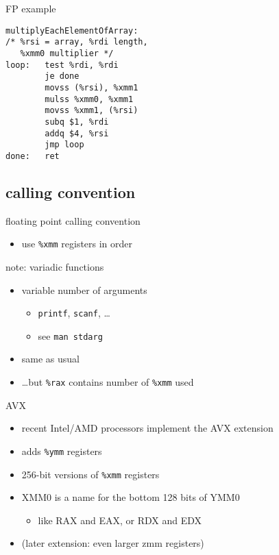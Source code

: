 \begin{frame}[fragile,label=fpExample]{FP example}
\begin{lstlisting}
multiplyEachElementOfArray:
/* %rsi = array, %rdi length,
   %xmm0 multiplier */
loop:   test %rdi, %rdi
        je done
        movss (%rsi), %xmm1
        mulss %xmm0, %xmm1
        movss %xmm1, (%rsi)
        subq $1, %rdi
        addq $4, %rsi
        jmp loop
done:   ret
\end{lstlisting}
\end{frame}

\subsection{calling convention}

\begin{frame}{floating point calling convention}
    \begin{itemize}
    \item use {\tt \%xmm} registers in order
    \end{itemize}
\end{frame}

\begin{frame}[fragile,label=variadic]{note: variadic functions}
    \begin{itemize}
    \item variable number of arguments
        \begin{itemize}
        \item {\tt printf}, {\tt scanf}, \ldots
        \item see {\tt man stdarg}
        \end{itemize}
    \vspace{.5cm}
    \item same as usual 
    \item \ldots but \lstinline|%rax| contains number of {\tt \%xmm} used
    \end{itemize}
\end{frame}

\begin{frame}{AVX}
    \begin{itemize}
    \item recent Intel/AMD processors implement the AVX extension
    \item adds {\tt \%ymm} registers
    \item 256-bit versions of {\tt \%xmm} registers
    \item XMM0 is a name for the bottom 128 bits of YMM0
        \begin{itemize}
        \item like RAX and EAX, or RDX and EDX
        \end{itemize}
    \item (later extension: even larger zmm registers)
    \end{itemize}
\end{frame}

